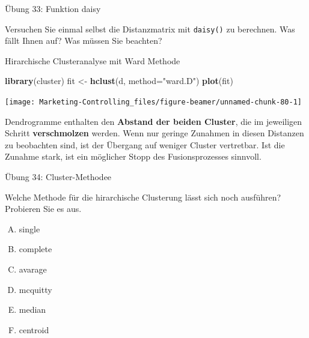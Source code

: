 \documentclass[12pt,ngerman,a4paper,ignorenonframetext,]{beamer}
\newenvironment{Shaded}{\begin{snugshade}}{\end{snugshade}}
\newcommand{\DataTypeTok}[1]{\textcolor[rgb]{0.13,0.29,0.53}{#1}}
\newcommand{\KeywordTok}[1]{\textcolor[rgb]{0.13,0.29,0.53}{\textbf{#1}}}
\newcommand{\NormalTok}[1]{#1}
\newcommand{\StringTok}[1]{\textcolor[rgb]{0.31,0.60,0.02}{#1}}
\providecommand{\tightlist}{%
  \setlength{\itemsep}{0pt}\setlength{\parskip}{0pt}}
\begin{document}
\begin{frame}[fragile]{Übung 33: Funktion daisy}
\protect\hypertarget{ubung-33-funktion-daisy}{}

Versuchen Sie einmal selbst die Distanzmatrix mit \texttt{daisy()} zu
berechnen. Was fällt Ihnen auf? Was müssen Sie beachten?


\end{frame}

\begin{frame}{Hirarchische Clusteranalyse mit Ward
Methode}
\protect\hypertarget{hirarchische-clusteranalyse-mit-ward-methode}{}

\begin{Shaded}
\begin{Highlighting}[]
\KeywordTok{library}\NormalTok{(cluster)}
\NormalTok{fit <-}\StringTok{ }\KeywordTok{hclust}\NormalTok{(d, }\DataTypeTok{method=}\StringTok{"ward.D"}\NormalTok{)  }
\KeywordTok{plot}\NormalTok{(fit) }
\end{Highlighting}
\end{Shaded}

\begin{center}\texttt{[image: Marketing-Controlling\_files/figure-beamer/unnamed-chunk-80-1]} \end{center}

Dendrogramme enthalten den \textbf{Abstand der beiden Cluster}, die im
jeweiligen Schritt \textbf{verschmolzen} werden. Wenn nur geringe
Zunahmen in diesen Distanzen zu beobachten sind, ist der Übergang auf
weniger Cluster vertretbar. Ist die Zunahme stark, ist ein möglicher
Stopp des Fusionsprozesses sinnvoll.

\end{frame}

\begin{frame}{Übung 34: Cluster-Methodee}
\protect\hypertarget{ubung-34-cluster-methodee}{}

Welche Methode für die hirarchische Clusterung lässt sich noch
ausführen? Probieren Sie es aus.

\begin{enumerate}
[A.]
\tightlist
\item
  single
\item
  complete
\item
  avarage
\item
  mcquitty
\item
  median
\item
  centroid
\end{enumerate}


\end{frame}
\end{document}
